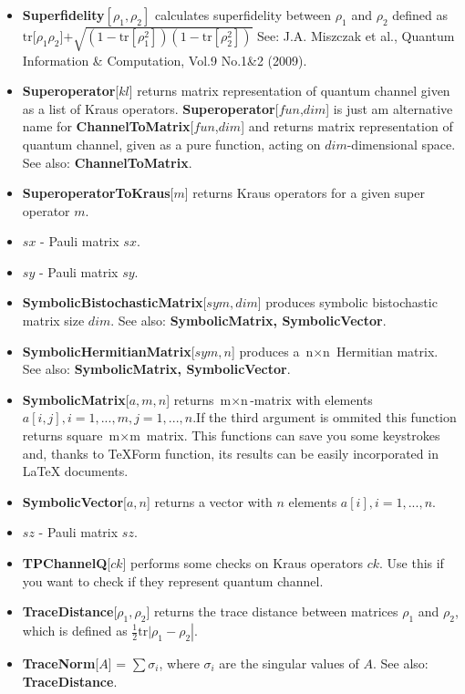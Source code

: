 \documentclass[a4paper,10pt]{scrartcl}
\begin{document}
\begin{itemize}
\item  \textbf{Superfidelity}$\left[\rho _1,\rho _2\right]$ calculates superfidelity between $\rho _1$ and $\rho _2$ defined as $\text{tr[}\rho _1\rho _2\text{]+}\sqrt{\left(1-\text{tr}\left[\rho _1^2\right]\right)\left(1-\text{tr}\left[\rho _2^2\right]\right)}$\newline{}
See: J.A. Miszczak et al., Quantum Information \& Computation, Vol.9 No.1\&2 (2009).
\item  \textbf{Superoperator}[$kl$] returns matrix representation of quantum channel given as a list of Kraus operators. \textbf{Superoperator}[$fun$,$dim$] is just am alternative name for \textbf{ChannelToMatrix}[$fun$,$dim$] and returns matrix representation of quantum channel, given as a pure function, acting on $dim$-dimensional space. See also: \textbf{ChannelToMatrix}.
\item  \textbf{SuperoperatorToKraus}[$m$] returns Kraus operators for a given super operator $m$.
\item  $sx$ - Pauli matrix $sx$.
\item  $sy$ - Pauli matrix $sy$.
\item  \textbf{SymbolicBistochasticMatrix}[$sym, dim$] produces symbolic bistochastic matrix size $dim$. See also: \textbf{SymbolicMatrix, SymbolicVector}.
\item  \textbf{SymbolicHermitianMatrix}[$sym,n$] produces a $\text{n$\times $n}$ Hermitian matrix. See also: \textbf{SymbolicMatrix, SymbolicVector}.
\item  \textbf{SymbolicMatrix}[$a,m,n$] returns $\text{m$\times $n}$-matrix with elements $a[i,j], i=1,...,m, j=1,...,n$.If the third argument is ommited this function returns square $\text{m$\times $m}$ matrix. This functions can save you some keystrokes and, thanks to TeXForm function, its results can be easily incorporated in LaTeX documents.
\item  \textbf{SymbolicVector}[$a,n$] returns a vector with $n$ elements $a[i],i=1,...,n$.
\item  $sz$ - Pauli matrix $sz$.
\item  \textbf{TPChannelQ}[$ck$] performs some checks on Kraus operators $ck$. Use this if you want to check if they represent quantum channel.
\item  \textbf{TraceDistance}[$\rho _1,\rho _2$] returns the trace distance between matrices $\rho _1$ and $\rho _2$, which is defined as $\left.\frac{1}{2}\text{tr$|$}\rho _1-\rho _2\right|$.
\item  \textbf{TraceNorm}[$A$] = $\sum \sigma _i$, where $\sigma _i$ are the singular values of $A$. See also: \textbf{TraceDistance}.

\end{itemize}
\end{document}
